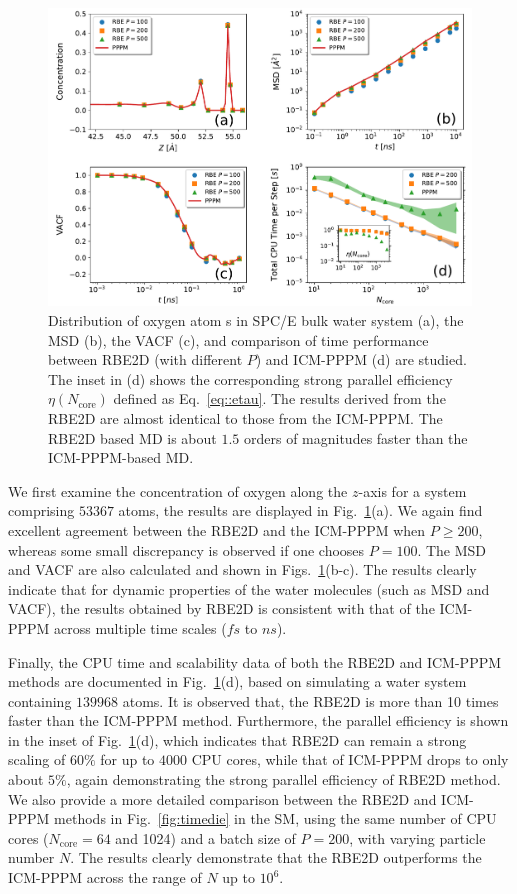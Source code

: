 \begin{figure}[ht]
\centering
\includegraphics[width=0.95\linewidth]{figs/Dielectric.pdf}
    \caption{Distribution of oxygen atom {s} in SPC/E bulk water system (a), the MSD (b), the VACF (c), and comparison of time performance between RBE2D (with different $P$) and ICM-PPPM (d) are studied. 
    The inset in (d) shows  {the} corresponding strong parallel efficiency $\eta(N_{\text{core}})$ defined as Eq.~\eqref{eq::etau}. 
    The results derived from the RBE2D   {are} almost identical to those from the ICM-PPPM. 
     {The RBE2D based MD is about $1.5$ orders of magnitudes faster than the ICM-PPPM-based MD.}
    }
    \label{fig:den2}
\end{figure}

We first examine the concentration of oxygen along  {the} $z$-axis for a system comprising $53367$ atoms, the results are displayed in Fig.~\ref{fig:den2}(a). 
We again find  excellent agreement between the RBE2D and the ICM-PPPM when $P\geq 200$, whereas some small discrepancy is observed if one chooses $P=100$. 
The MSD and VACF are also calculated and shown in Figs.~\ref{fig:den2}(b-c).
The results clearly indicate that for dynamic properties of the water molecules (such as MSD and VACF), the results obtained by RBE2D is consistent   {with} that of the ICM-PPPM  {across} multiple time scales ($fs$ to $ns$). 

Finally, the CPU time and scalability data of both the RBE2D and ICM-PPPM methods are documented in Fig.~\ref{fig:den2}(d), based on simulating a water system containing $139968$ atoms. It is observed that, the RBE2D is more than 10 times faster than the ICM-PPPM method. 
Furthermore, the   {parallel efficiency} is shown in the inset of Fig.~\ref{fig:den2}(d), which indicates that RBE2D can remain a strong scaling of $60\%$ for up to $4000$ CPU cores, while that of ICM-PPPM drops to only about $5\%$, again demonstrating the strong   {parallel efficiency} of RBE2D method.  {We also provide a more detailed comparison between the RBE2D and ICM-PPPM methods in Fig.~\ref{fig:timedie} in the SM, using the same number of CPU cores (\( N_{\text{core}} = 64 \) and 1024) and a batch size of \( P = 200 \), with varying particle number $N$. 
The results clearly demonstrate that the RBE2D outperforms the ICM-PPPM across the range of \( N \) up to \( 10^6 \).}

